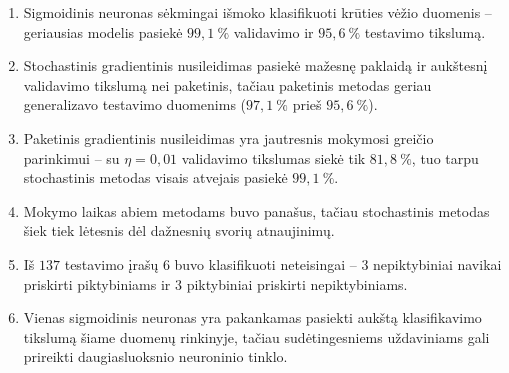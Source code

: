 \label{sec:isvados}

\begin{enumerate}
    \item Sigmoidinis neuronas sėkmingai išmoko klasifikuoti krūties vėžio duomenis – geriausias modelis pasiekė $99{,}1\ \%$ validavimo ir $95{,}6\ \%$ testavimo tikslumą.
    \item Stochastinis gradientinis nusileidimas pasiekė mažesnę paklaidą ir aukštesnį validavimo tikslumą nei paketinis, tačiau paketinis metodas geriau generalizavo testavimo duomenims ($97{,}1\ \%$ prieš $95{,}6\ \%$).
    \item Paketinis gradientinis nusileidimas yra jautresnis mokymosi greičio parinkimui – su $\eta = 0{,}01$ validavimo tikslumas siekė tik $81{,}8\ \%$, tuo tarpu stochastinis metodas visais atvejais pasiekė $99{,}1\ \%$.
    \item Mokymo laikas abiem metodams buvo panašus, tačiau stochastinis metodas šiek tiek lėtesnis dėl dažnesnių svorių atnaujinimų.
    \item Iš $137$ testavimo įrašų $6$ buvo klasifikuoti neteisingai – $3$ nepiktybiniai navikai priskirti piktybiniams ir $3$ piktybiniai priskirti nepiktybiniams.
    \item Vienas sigmoidinis neuronas yra pakankamas pasiekti aukštą klasifikavimo tikslumą šiame duomenų rinkinyje, tačiau sudėtingesniems uždaviniams gali prireikti daugiasluoksnio neuroninio tinklo.
\end{enumerate}